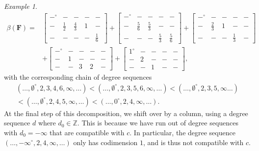 \documentclass[12pt]{amsart}
\theoremstyle{definition}
\theoremstyle{remark}
\newtheorem{example}[lemma]{Example}
\newcommand{\ZZ}{\mathbb{Z}}
\newcommand{\cc}{c}
\newcommand{\FF}{\mathbf{F}}
\newcommand{\zp}{\circ}
\begin{document}
\begin{example}
\begin{align*}
\beta(\FF)=&
\begin{bmatrix}
-^\zp&-&-&-&-\\
-&\frac{1}{2}&\frac{4}{3}&1&-\\
-&-&-&-&\frac{1}{6}
\end{bmatrix}
+
\begin{bmatrix}
-^\zp&-&-&-&-\\
-&\frac{5}{6}&\frac{5}{3}&-&-\\
-&-&-&\frac{5}{3}&\frac{5}{6}
\end{bmatrix}
+
\begin{bmatrix}
-^\zp&-&-&-&-\\
-&\frac{2}{3}&1&-&-\\
-&-&-&\frac{1}{3}&-
\end{bmatrix}\\
&
+
\begin{bmatrix}
-^\zp&-&-&-&-\\
-&1&-&-&-\\
-&-&3&2&-
\end{bmatrix}
+
\begin{bmatrix}
1^\zp&-&-&-&-\\
-&2&-&-&-\\
-&-&1&-&-
\end{bmatrix},
\end{align*}
with the corresponding chain of degree sequences
\begin{align*}
(\dots,\emptyset^\zp,2,3,4,6,\infty,\dots)<(\dots,\emptyset^\zp,2,3,5,6,\infty,\dots)<(\dots,\emptyset^\zp,2,3,5,\infty\dots)
\\
<(\dots,\emptyset^\zp,2,4,5,\infty,\dots)<(\dots,0^\zp,2,4,\infty,\dots).
\end{align*}
At the final step of this decomposition, we shift over by a column, using a degree sequence $d$ where $d_0\in\ZZ$.  This is because we have run out of degree sequences with $d_0=-\infty$ that are compatible with $\cc$.  In particular, the degree sequence $(\dots, -\infty^\zp,2,4,\infty,\dots)$ only has codimension $1$, and is thus not compatible with $\cc$.
\end{example}
\end{document}
